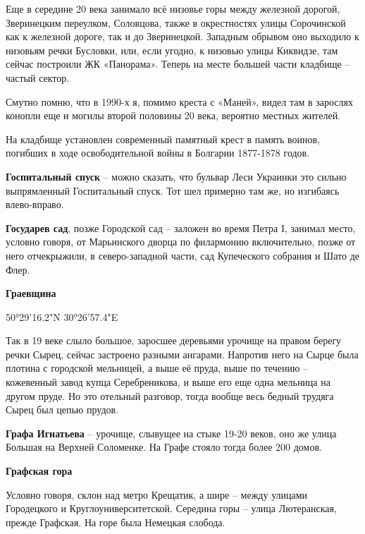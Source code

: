 Еще в середине 20 века занимало всё низовье горы между железной дорогой, Зверинецким переулком, Соловцова, также в окрестностях улицы Сорочинской как к железной дороге, так и до Зверинецкой. Западным обрывом оно выходило к низовьям речки Бусловки, или, если угодно, к низовью улицы Киквидзе, там сейчас построили ЖК «Панорама». Теперь на месте большей части кладбище – частый сектор.

Смутно помню, что в 1990-х я, помимо креста с «Маней», видел там в зарослях конопли еще и могилы второй половины 20 века, вероятно местных жителей.

На кладбище установлен современный памятный крест в память воинов, погибших в ходе освободительной войны в Болгарии 1877-1878 годов.\\

\medskip

\textbf{Госпитальный спуск} – можно сказать, что бульвар Леси Украинки это сильно выпрямленный Госпитальный спуск. Тот шел примерно там же, но изгибаясь влево-вправо.\\

\medskip

\textbf{Государев сад}, позже Городской сад – заложен во время Петра I, занимал место, условно говоря, от Марьинского дворца по филармонию включительно, позже от него отчекрыжили, в северо-западной части, сад Купеческого собрания и Шато де Флер.

\medskip

\textbf{Граевщина} 

50°29'16.2"N 30°26'57.4"E

Так в 19 веке слыло большое, заросшее деревьями урочище на правом берегу речки Сырец, сейчас застроено разными ангарами. Напротив него на Сырце была плотина с городской мельницей, а выше её пруда, выше по течению – кожевенный завод купца Серебреникова, и выше его еще одна мельница на другом пруде. Но это отельный разговор, тогда вообще весь бедный трудяга Сырец был цепью прудов.\\

\medskip

\textbf{Графа Игнатьева} – урочище, слывущее на стыке 19-20 веков, оно же улица Большая на Верхней Соломенке. На Графе стояло тогда более 200 домов.\\

\medskip

\textbf{Графская гора} 

Условно говоря, склон над метро Крещатик, а шире – между улицами Городецкого и Круглоуниверситетской. Середина горы – улица Лютеранская, прежде Графская. На горе была Немецкая слобода.\\

